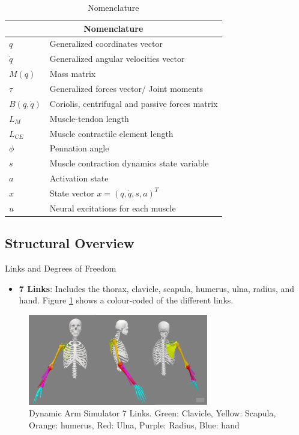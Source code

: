\begin{table}[h!]
    \centering
    \caption{Nomenclature}
    \label{tab:nomenclature}
    \begin{tabular}{|l l|}
        \hline
        \multicolumn{2}{|c|}{\textbf{Nomenclature}} \\ \hline
        \textbf{$q$} & Generalized coordinates vector \\
        \textbf{$\dot{q}$} & Generalized angular velocities vector \\
        \textbf{$M(q)$} & Mass matrix \\
        \textbf{$\tau$} & Generalized forces vector/ Joint moments \\
        \textbf{$B(q,\dot{q})$} & Coriolis, centrifugal and passive forces matrix \\
        $L_M$ & Muscle-tendon length \\
        $L_{CE}$ & Muscle contractile element length \\
        $\phi$ & Pennation angle \\
        $s$ & Muscle contraction dynamics state variable \\
        $a$ & Activation state \\
       \textbf{$x$} & State vector $x = (q,\dot{q},s,a)^T$ \\
       \textbf{$u$} & Neural excitations for each muscle \\ \hline
    \end{tabular}
\end{table}
\newpage
\subsection{Structural Overview}
Links and Degrees of Freedom
\begin{itemize}
    \item \textbf{7 Links}: Includes the thorax, clavicle, scapula, humerus, ulna, radius, and hand. Figure \ref{fig:links} shows a colour-coded of the different links. 
\end{itemize}

\begin{figure}[h!]
    \centering
    \includegraphics[width=0.7\textwidth]{Pictures/DAS/Links.png}
    \caption{Dynamic Arm Simulator 7 Links. Green: Clavicle, Yellow: Scapula, Orange: humerus, Red: Ulna, Purple: Radius, Blue: hand}
    \label{fig:links}
\end{figure}

